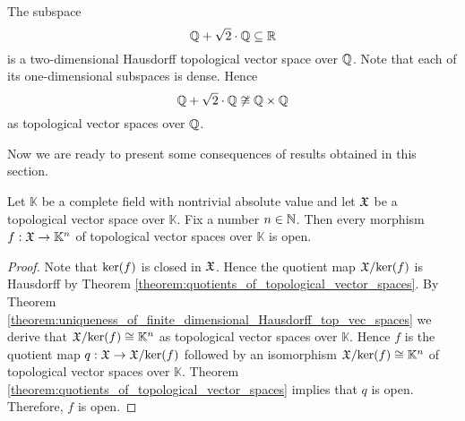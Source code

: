 \begin{example}\label{example:two_dimensional_top_vec_space_over_rationals_which_is_not_square_of_rationals}
   The subspace
   $${\mathbb Q} + \sqrt{2}\cdot {\mathbb Q}\subseteq {\mathbb R}$$
   is a two-dimensional Hausdorff topological vector space over ${\mathbb Q}$. Note that each of its one-dimensional subspaces is dense. Hence
   $${\mathbb Q} + \sqrt{2}\cdot {\mathbb Q} \not \cong {\mathbb Q}\times {\mathbb Q}$$
   as topological vector spaces over ${\mathbb Q}$.
\end{example}
\noindent
Now we are ready to present some consequences of results obtained in this section.

\begin{corollary}\label{corollary:continuous_map_to_standard_finite_dimensional_is_open}
   Let $\mathbb{K}$ be a complete field with nontrivial absolute value and let ${\mathfrak X}$ be a topological vector space over $\mathbb{K}$. Fix a number $n \in {\mathbb N}$. Then every morphism $f:{\mathfrak X}\rightarrow \mathbb{K}^n$ of topological vector spaces over $\mathbb{K}$ is open.
\end{corollary}
\begin{proof}
   Note that $\mathrm{ker}(f)$ is closed in ${\mathfrak X}$. Hence the quotient map ${\mathfrak X}/\mathrm{ker}(f)$ is Hausdorff by Theorem \ref{theorem:quotients_of_topological_vector_spaces}. By Theorem \ref{theorem:uniqueness_of_finite_dimensional_Hausdorff_top_vec_spaces} we derive that ${\mathfrak X}/\mathrm{ker}(f) \cong \mathbb{K}^n$ as topological vector spaces over $\mathbb{K}$. Hence $f$ is the quotient map $q:{\mathfrak X}\rightarrow {\mathfrak X}/\mathrm{ker}(f)$ followed by an isomorphism ${\mathfrak X}/\mathrm{ker}(f)\cong \mathbb{K}^n$ of topological vector spaces over $\mathbb{K}$. Theorem \ref{theorem:quotients_of_topological_vector_spaces} implies that $q$ is open. Therefore, $f$ is open.
\end{proof}

